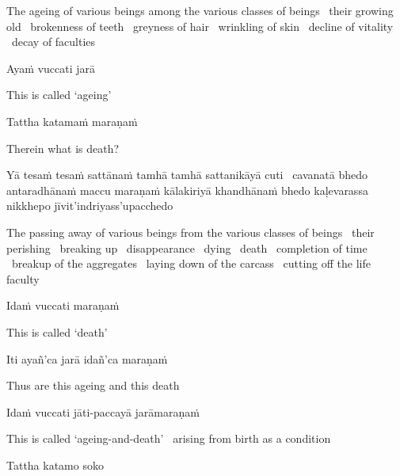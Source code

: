 \begin{english-hang-verses}
The ageing of various beings among the various classes of beings \breathmark\ their growing old \breathmark\ brokenness of teeth \breathmark\ greyness of hair \breathmark\ wrinkling of skin \breathmark\ decline of vitality \breathmark\ decay of faculties
\end{english-hang-verses}

Ayaṁ vuccati jarā

\begin{english}
This is called `ageing'
\end{english}

Tattha katamaṁ maraṇaṁ

\begin{english}
Therein what is death?
\end{english}

\begin{pali-hang}
Yā tesaṁ tesaṁ sattānaṁ tamhā tamhā sattanikāyā cuti \breathmark\ cavanatā bhedo antaradhānaṁ maccu maraṇaṁ kālakiriyā khandhānaṁ bhedo kaḷevarassa nikkhepo jīvit'indriyass'upacchedo
\end{pali-hang}

\begin{english-hang-verses}
The passing away of various beings from the various classes of beings \breathmark\ their perishing \breathmark\ breaking up \breathmark\ disappearance \breathmark\ dying \breathmark\ death \breathmark\ completion of time \breathmark\ breakup of the aggregates \breathmark\ laying down of the carcass \breathmark\ cutting off the life faculty
\end{english-hang-verses}

Idaṁ vuccati maraṇaṁ

\begin{english}
This is called `death'
\end{english}

Iti ayañ'ca jarā idañ'ca maraṇaṁ

\begin{english}
Thus are this ageing and this death
\end{english}

Idaṁ vuccati jāti-paccayā jarāmaraṇaṁ

\begin{english}
  This is called `ageing-and-death' \breathmark\ arising from birth as a condition
\end{english}

Tattha katamo soko

